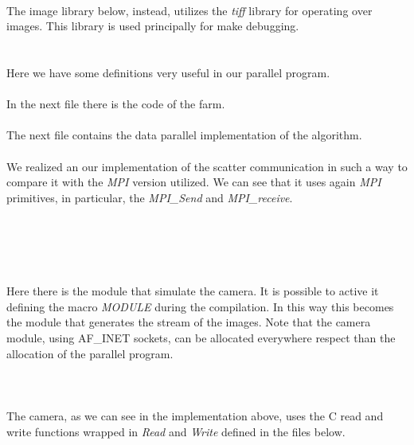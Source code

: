 \ \\The image library below, instead, utilizes the \textit{tiff} library for operating over images. This library is used principally for make debugging.
\ \\

\ \\

\ \\
Here we have some definitions very useful in our parallel program.
\ \\

\ \\
In the next file there is the code of the farm.
\ \\

\ \\
The next file contains the data parallel implementation of the algorithm.
\ \\

\ \\
We realized an our implementation of the scatter communication in such a way to compare it with the \textit{MPI} version utilized. We can see that it uses again \textit{MPI} primitives, in particular, the \textit{MPI\_Send} and \textit{MPI\_receive}. 
\ \\

\ \\
\ \\

\ \\
\ \\

\ \\
Here there is the module that simulate the camera. It is possible to active it defining the macro \textit{MODULE} during the compilation. In this way this becomes the module that generates the stream of the images. Note that the camera module, using AF\_INET sockets, can be allocated everywhere respect than the allocation of the parallel program.
\ \\

\ \\
\ \\

\ \\
The camera, as we can see in the implementation above, uses the C read and write functions wrapped in \textit{Read} and \textit{Write} defined in the files below.
\ \\

\ \\
\ \\

\ \\